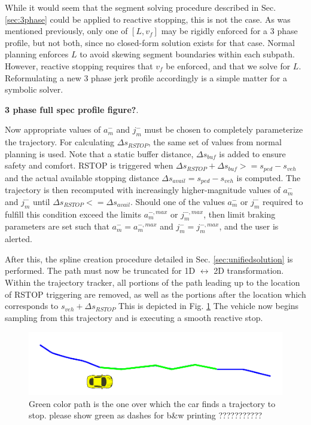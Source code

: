 \documentclass[letterpaper, 10 pt, conference]{ieeeconf}  %
\begin{document}
While it would seem that the segment solving procedure described in Sec. \ref{sec:3phase} could be applied to reactive stopping, this is not the case.
As was mentioned previously, only one of $[L, v_f]$ may be rigidly enforced for a 3 phase profile, but not both, since no closed-form solution exists for that case.
Normal planning enforces $L$ to avoid skewing segment boundaries within each subpath.
However, reactive stopping requires that $v_f$ be enforced, and that we solve for $L$.
Reformulating a new 3 phase jerk profile accordingly is a simple matter for a symbolic solver.

\textbf{3 phase full spec profile figure?}. 

Now appropriate values of $a_m^-$ and $j_m^-$ must be chosen to completely parameterize the trajectory.
For calculating $\Delta s_{RSTOP}$, the same set of values from normal planning is used.
Note that a static buffer distance, $\Delta s_{buf}$ is added to ensure safety and comfort.
RSTOP is triggered when $\Delta s_{RSTOP} + \Delta s_{buf} >= s_{ped} - s_{veh}$ and the actual available stopping distance $\Delta s_{avail} = s_{ped} - s_{veh}$ is computed.
The trajectory is then recomputed with increasingly higher-magnitude values of $a_m^-$ and $j_m^-$ until $\Delta s_{RSTOP} <= \Delta s_{avail}$.
Should one of the values $a_m^-$ or $j_m^-$ required to fulfill this condition exceed the limits $a_m^{-,max}$ or $j_m^{-,max}$, then limit braking parameters are set such that $a_m^-=a_m^{-,max}$ and $j_m^-=j_m^{-,max}$, and the user is alerted.

After this, the spline creation procedure detailed in Sec. \ref{sec:unifiedsolution} is performed.
The path must now be truncated for 1D $\leftrightarrow$ 2D transformation.
Within the trajectory tracker, all portions of the path leading up to the location of RSTOP triggering are removed, as well as the portions after the location which corresponds to $s_{veh} + \Delta s_{RSTOP}$
This is depicted in Fig. \ref{fig:pathtostop}
The vehicle now begins sampling from this trajectory and is executing a smooth reactive stop.

\begin{figure}[thpb]
  \centering
  \includegraphics[width=1.0\columnwidth]{graphics/RSTOP_path_truncation.png}
  \caption{Green color path is the one over which the car finds a trajectory to stop. please show green as dashes for b\&w printing ??????????? }
  \label{fig:pathtostop}
\end{figure}
\end{document}

